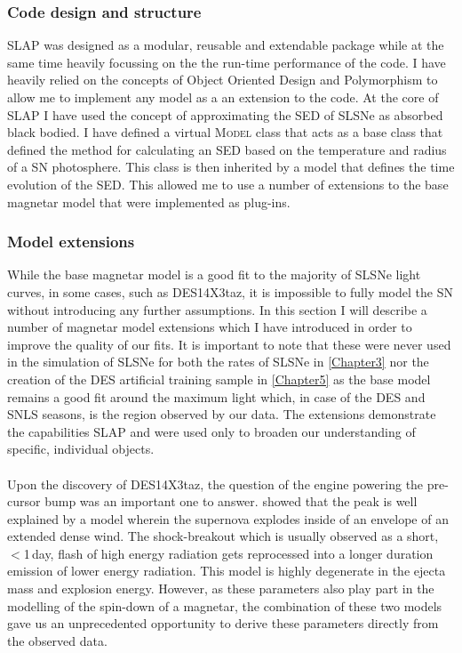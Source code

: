 \subsubsection{Code design and structure}
SLAP was designed as a modular, reusable and extendable package while at the same time heavily focussing on the the run-time performance of the code. I have heavily relied on the concepts of Object Oriented Design and Polymorphism to allow me to implement any model as a an extension to the code. At the core of \textsc{SLAP} I have used the concept of approximating the SED of SLSNe as absorbed black bodied. I have defined a virtual \textsc{Model} class that acts as a base class that defined the method for calculating an SED based on the temperature and radius of a SN photosphere. This class is then inherited by a model that defines the time evolution of the SED. This allowed me to use a number of extensions to the base magnetar model that were implemented as plug-ins.

\subsubsection{Model extensions}
While the base magnetar model is a good fit to the majority of SLSNe light curves, in some cases, such as DES14X3taz, it is impossible to fully model the SN without introducing any further assumptions. In this section I will describe a number of magnetar model extensions which I have introduced in order to improve the quality of our fits. It is important to note that these were never used in the simulation of SLSNe for both the rates of SLSNe in \cref{Chapter3} nor the creation of the DES artificial training sample in \cref{Chapter5} as the base model remains a good fit around the maximum light which, in case of the DES and SNLS seasons, is the region observed by our data. The extensions demonstrate the capabilities \textsc{SLAP} and were used only to broaden our understanding of specific, individual objects.

\paragraph{\citet{Piro2015}}
Upon the discovery of DES14X3taz, the question of the engine powering the pre-cursor bump was an important one to answer. \citet{Smith2016} showed that the peak is well explained by a model wherein the supernova explodes inside of an envelope of an extended dense wind. The shock-breakout which is usually observed as a short, $<$1\,day, flash of high energy radiation gets reprocessed into a longer duration emission of lower energy radiation. This model is highly degenerate in the ejecta mass and explosion energy. However, as these parameters also play part in the modelling of the spin-down of a magnetar, the combination of these two models gave us an unprecedented opportunity to derive these parameters directly from the observed data.

